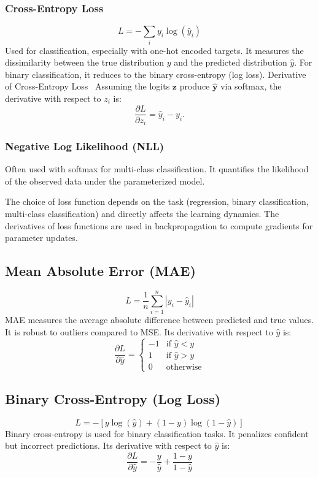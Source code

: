 \documentclass[a4paper, journal]{IEEEtran}
\begin{document}
\subsubsection{Cross-Entropy Loss}
\begin{equation}
    L = -\sum_{i} y_i \log(\hat{y}_i)
\end{equation}
Used for classification, especially with one-hot encoded targets. It measures the dissimilarity between the true distribution \(y\) and the predicted distribution \(\hat{y}\). For binary classification, it reduces to the binary cross-entropy (log loss).
Derivative of Cross-Entropy Loss
\
Assuming the logits \(\mathbf{z}\) produce \(\boldsymbol{\hat{y}}\) via softmax, the derivative with respect to \(z_i\) is:
\[
    \frac{\partial L}{\partial z_i} = \hat{y}_i - y_i.
\]

\subsubsection{Negative Log Likelihood (NLL)}
Often used with softmax for multi-class classification. It quantifies the likelihood of the observed data under the parameterized model.

The choice of loss function depends on the task (regression, binary classification, multi-class classification) and directly affects the learning dynamics. The derivatives of loss functions are used in backpropagation to compute gradients for parameter updates.

\subsection{Mean Absolute Error (MAE)}
\begin{equation}
    L = \frac{1}{n}\sum_{i=1}^n |y_i - \hat{y}_i|
\end{equation}
MAE measures the average absolute difference between predicted and true values. It is robust to outliers compared to MSE. Its derivative with respect to \(\hat{y}\) is:
\begin{equation}
    \frac{\partial L}{\partial \hat{y}} = 
    \begin{cases} 
        -1 & \text{if } \hat{y} < y \\ 
        1 & \text{if } \hat{y} > y \\ 
        0 & \text{otherwise} 
    \end{cases}
\end{equation}

\subsection{Binary Cross-Entropy (Log Loss)}
\begin{equation}
    L = -[y \log(\hat{y}) + (1-y)\log(1-\hat{y})]
\end{equation}
Binary cross-entropy is used for binary classification tasks. It penalizes confident but incorrect predictions. Its derivative with respect to \(\hat{y}\) is:
\begin{equation}
    \frac{\partial L}{\partial \hat{y}} = -\frac{y}{\hat{y}} + \frac{1-y}{1-\hat{y}}
\end{equation}
\end{document}
